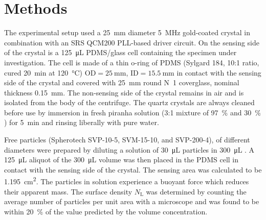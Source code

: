 \documentclass[floatfix,superscriptaddress,a4paper,twocolumn]{revtex4-1}
\begin{document}
\section*{Methods}
\label{sec:materials}
The experimental setup used a \SI{25}{\milli\meter} diameter
\SI{5}{\mega\hertz} gold-coated crystal in combination with an SRS QCM200
PLL-based driver circuit.  On the sensing side of the crystal is a
\SI{125}{\micro\liter} PDMS/glass cell containing the specimen under
investigation.  The cell is made of a thin o-ring of PDMS (Sylgard 184,
10:1 ratio, cured \SI{20}{\minute} at \SI{120}{\celsius})
$\text{OD}=\SI{25}{\milli\meter}$, $\text{ID}=\SI{15.5}{\milli\meter}$ in
contact with the sensing side of the crystal and covered with
\SI{25}{\milli\meter} round N~1
coverglass, nominal thickness \SI{0.15}{\milli\meter}.  The non-sensing
side of the crystal remains in air and is isolated from the body of the
centrifuge.  The quartz crystals are always cleaned before use by immersion
in fresh piranha solution (3:1 mixture of \SI{97}{\percent}  and
\SI{30}{\percent} ) for \SI{5}{\minute} and rinsing liberally with
pure water.

Free particles (Spherotech SVP-10-5, SVM-15-10, and SVP-200-4), of
different diameters were prepared by diluting a solution of
\SI{30}{\micro\liter} particles in \SI{300}{\micro\liter} .  A
\SI{125}{\micro\liter} aliquot of the \SI{300}{\micro\liter} volume was
then placed in the PDMS cell in contact with the sensing side of the
crystal.  The sensing area was calculated to be
\SI{1.195}{\centi\meter\squared}.  The particles in solution experience a
buoyant force which reduces their apparent mass. The surface density
$N_\mathrm{L}$ was determined by counting the average number of particles
per unit area with a microscope and was found to be within
\SI{20}{\percent} of the value predicted by the volume concentration.
\end{document}
